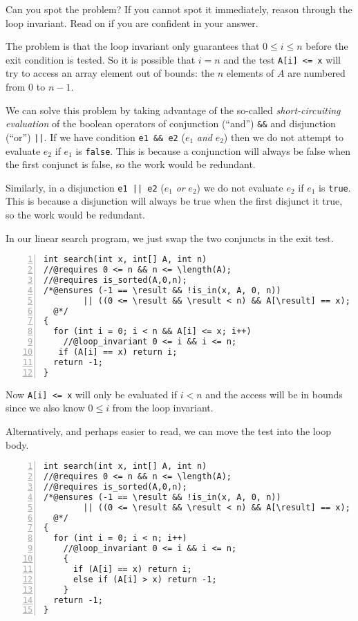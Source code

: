 Can you spot the problem?  If you cannot spot it immediately,
reason through the loop invariant.  Read on if you are confident
in your answer.

\clearpage
The problem is that the loop invariant only guarantees
that $0 \leq i \leq n$ before the exit condition is tested.
So it is possible that $i = n$ and the test \lstinline'A[i] <= x'
will try to access an array element out of bounds: the $n$
elements of $A$ are numbered from $0$ to $n-1$.

We can solve this problem by taking advantage of the so-called
\emph{short-circuiting evaluation} of the boolean operators of
conjunction (``and'') \lstinline'&&' and disjunction (``or'') \lstinline'||'.
If we have condition \lstinline'e1 && e2' ($e_1$ \emph{and} $e_2$) then we
do not attempt to evaluate $e_2$ if $e_1$ is \lstinline'false'.  This is
because a conjunction will always be false when the first conjunct is
false, so the work would be redundant.

Similarly, in a disjunction \lstinline'e1 || e2' ($e_1$ \emph{or} $e_2$)
we do not evaluate $e_2$ if $e_1$ is \lstinline'true'.  This is because
a disjunction will always be true when the first disjunct it
true, so the work would be redundant.

In our linear search program, we just swap the two conjuncts in
the exit test.
%
\begin{lstlisting}[language={[C0]C}, numbers=left]
int search(int x, int[] A, int n)
//@requires 0 <= n && n <= \length(A);
//@requires is_sorted(A,0,n);
/*@ensures (-1 == \result && !is_in(x, A, 0, n))
        || ((0 <= \result && \result < n) && A[\result] == x);
  @*/
{
  for (int i = 0; i < n && A[i] <= x; i++)
    //@loop_invariant 0 <= i && i <= n;
   if (A[i] == x) return i;
  return -1;
}
\end{lstlisting}

\noindent
Now \lstinline'A[i] <= x' will only be evaluated if $i < n$ and
the access will be in bounds since we also know $0 \leq i$
from the loop invariant.

Alternatively, and perhaps easier to read, we can move
the test into the loop body.
\clearpage
%
\begin{lstlisting}[language={[C0]C}, numbers=left]
int search(int x, int[] A, int n)
//@requires 0 <= n && n <= \length(A);
//@requires is_sorted(A,0,n);
/*@ensures (-1 == \result && !is_in(x, A, 0, n))
        || ((0 <= \result && \result < n) && A[\result] == x);
  @*/
{
  for (int i = 0; i < n; i++)
    //@loop_invariant 0 <= i && i <= n;
    {
      if (A[i] == x) return i;
      else if (A[i] > x) return -1;
    }
  return -1;
}
\end{lstlisting}

